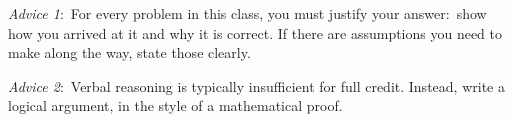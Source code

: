 \documentclass[12pt]{article}
\begin{document}
\renewcommand{\headrulewidth}{0.4pt}

\begin{small}
\textit{Advice 1}:\ For every problem in this class, you must justify your answer:\ show how you arrived at it and why it is correct. If there are assumptions you need to make along the way, state those clearly.

\vspace{-3mm}
\textit{Advice 2}:\ Verbal reasoning is typically insufficient for full credit. Instead, write a logical argument, in the style of a mathematical proof.
\vspace{-4mm}
\end{small}

\hrulefill
\end{document}
